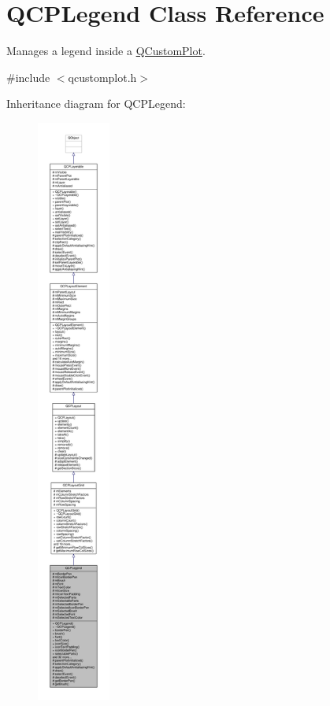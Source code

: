 \hypertarget{class_q_c_p_legend}{}\section{Q\+C\+P\+Legend Class Reference}
\label{class_q_c_p_legend}


Manages a legend inside a \hyperlink{class_q_custom_plot}{Q\+Custom\+Plot}.  




{\ttfamily \#include $<$qcustomplot.\+h$>$}



Inheritance diagram for Q\+C\+P\+Legend\+:\nopagebreak
\begin{figure}[H]
\begin{center}
\leavevmode
\includegraphics[height=550pt]{class_q_c_p_legend__inherit__graph}
\end{center}
\end{figure}


